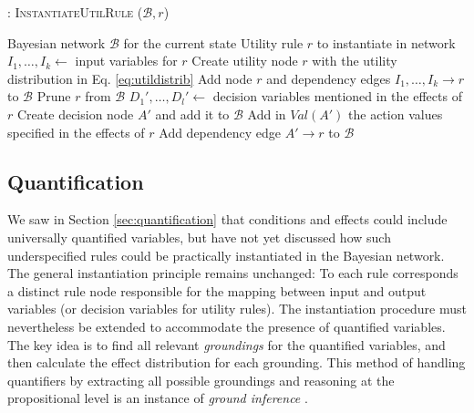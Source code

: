 \begin{algorithm}[h!]
\caption{: \textsc{InstantiateUtilRule} ($\mathcal{B}, \mathit{r}$)}
\begin{algorithmic}[1] \vspace{1mm}
\REQUIRE Bayesian network $\mathcal{B}$ for the current state
\REQUIRE Utility rule $\mathit{r}$ to instantiate in network  \vspace{1mm}
\STATE $I_1, \dots, I_k \leftarrow $ input variables for $r$
\STATE Create utility node $r$ with the utility distribution in Eq. \eqref{eq:utildistrib}
\STATE Add node $r$ and dependency edges $I_1, \dots, I_k \rightarrow r$ to $\mathcal{B}$ 
\STATE Prune $r$ from $\mathcal{B}$
\ELSE
\STATE $D_1', \dots, D_l' \leftarrow$ decision variables mentioned in the effects of $r$
\STATE Create decision node $A'$ and add it to $\mathcal{B}$
\ENDIF
\STATE Add in $\mathit{Val}(A')$ the action values specified in the effects of $r$
\STATE Add dependency edge $A' \rightarrow r$ to $\mathcal{B}$ 
\ENDFOR
\ENDIF
\end{algorithmic}
\label{algo:instantiateUtilRule}
\end{algorithm}

\subsection{Quantification}
\label{sec:applicationquantif}

We saw in Section \ref{sec:quantification} that conditions and effects could include universally quantified variables, but have not yet discussed how such underspecified rules could be practically instantiated in the Bayesian network. The general instantiation principle remains unchanged: To each rule corresponds a distinct rule node responsible for the mapping between input and output variables (or decision variables for utility rules). The instantiation procedure must nevertheless be extended to accommodate the presence of quantified variables.  The key idea is to find all relevant \textit{groundings} for the quantified variables, and then calculate the effect distribution for each grounding. This method of handling quantifiers by extracting all possible groundings and reasoning at the propositional level is an instance of \textit{ground inference} \citep{getoor:srlbook07}. 

